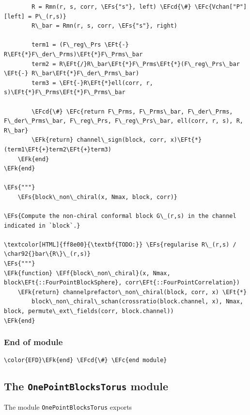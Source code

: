\documentclass[a4paper]{article}
\numberwithin{equation}{section}
\newcommand{\EFc}[1]{\textcolor{EFc}{#1}} %
\newcommand{\EFcd}[1]{\textcolor{EFcd}{#1}} %
\newcommand{\EFs}[1]{\textcolor{EFs}{#1}} %
\newcommand{\EFk}[1]{\textcolor{EFk}{#1}} %
\newcommand{\EFf}[1]{\textcolor{EFf}{#1}} %
\newcommand{\EFt}[1]{\textcolor{EFt}{#1}} %
\begin{document}
\begin{Code}
\begin{Verbatim}
        R = Rmn(r, s, corr, \EFs{"s"}, left) \EFcd{\#} \EFc{Vchan["P"][left] = P\_(r,s)}
        R\_bar = Rmn(r, s, corr, \EFs{"s"}, right)

        term1 = (F\_reg\_Prs \EFt{-} R\EFt{*}F\_der\_Prms)\EFt{*}F\_Prms\_bar
        term2 = R\EFt{/}R\_bar\EFt{*}F\_Prms\EFt{*}(F\_reg\_Prs\_bar \EFt{-} R\_bar\EFt{*}F\_der\_Prms\_bar)
        term3 = \EFt{-}R\EFt{*}ell(corr, r, s)\EFt{*}F\_Prms\EFt{*}F\_Prms\_bar

        \EFcd{\#} \EFc{return F\_Prms, F\_Prms\_bar, F\_der\_Prms, F\_der\_Prms\_bar, F\_reg\_Prs, F\_reg\_Prs\_bar, ell(corr, r, s), R, R\_bar}
        \EFk{return} channel\_sign(block, corr, x)\EFt{*}(term1\EFt{+}term2\EFt{+}term3)
    \EFk{end}
\EFk{end}

\EFs{"""}
    \EFs{block\_non\_chiral(x, Nmax, block, corr)}

\EFs{Compute the non-chiral conformal block G\_(r,s) in the channel indicated in `block`.}

\textcolor[HTML]{ff8e00}{\textbf{TODO:}} \EFs{regularise R\_(r,s) / \char92{}bar\{R\}\_(r,s)}
\EFs{"""}
\EFk{function} \EFf{block\_non\_chiral}(x, Nmax, block\EFt{::FourPointBlockSphere}, corr\EFt{::FourPointCorrelation})
    \EFk{return} channelprefactor\_non\_chiral(block, corr, x) \EFt{*}
        block\_non\_chiral\_schan(crossratio(block.channel, x), Nmax, block, permute\_ext\_fields(corr, block.channel))
\EFk{end}
\end{Verbatim}
\end{Code}
\subsubsection*{End of module}
\label{sec:org370182b}

\begin{Code}
\begin{Verbatim}
\color{EFD}\EFk{end} \EFcd{\#} \EFc{end module}
\end{Verbatim}
\end{Code}
\subsection{The \texttt{OnePointBlocksTorus} module}
\label{sec:org08c2b51}
The module \texttt{OnePointBlocksTorus} exports
\end{document}
